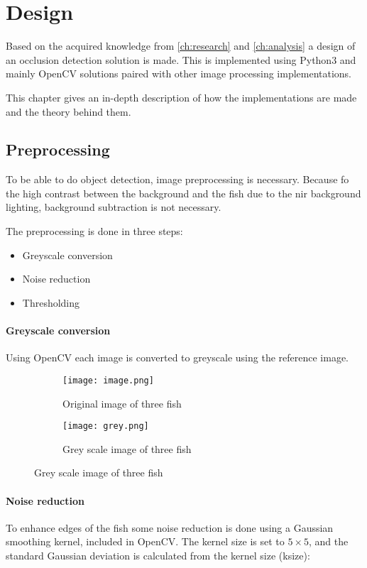 \graphicspath{{figures/design/}}
\chapter{Design}\label{ch:design}
Based on the acquired knowledge from \autoref{ch:research} and \autoref{ch:analysis} a design of an occlusion detection solution is made. This is implemented using Python3 and mainly OpenCV solutions paired with other image processing implementations.

This chapter gives an in-depth description of how the implementations are made and the theory behind them.

\section{Preprocessing}
To be able to do object detection, image preprocessing is necessary. Because fo the high contrast between the background and the fish due to the \gls{nir} background lighting, background subtraction is not necessary. 

The preprocessing is done in three steps:

\begin{itemize}
	\item Greyscale conversion
	\item Noise reduction
	\item Thresholding
\end{itemize}

\subsubsection{Greyscale conversion}
Using OpenCV each image is converted to greyscale using the reference image.

\begin{figure}[H]
	\centering
	\begin{subfigure}[b]{0.43\textwidth}
		\texttt{[image: image.png]}
		\caption{Original image of three fish}
		\label{fig:grey_orig}
	\end{subfigure}
	\begin{subfigure}[b]{0.43\textwidth}
		\texttt{[image: grey.png]}
		\caption{Grey scale image of three fish}
		\label{fig:grey}
	\end{subfigure}
	\label{fig:orig_to_grey}
\end{figure}

\subsubsection{Noise reduction}
To enhance edges of the fish some noise reduction is done using a Gaussian smoothing kernel, included in OpenCV. The kernel size is set to $5 \times 5$, and the standard Gaussian deviation is calculated from the kernel size (ksize):

